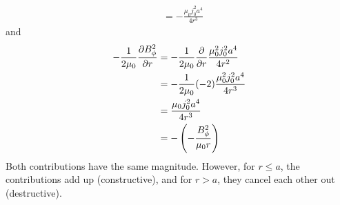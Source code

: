 \documentclass[answers]{exam}
\begin{document}
\begin{questions}
\begin{solution}
\begin{align*}
                                 &= -\frac{\mu_0j_0^2a^4}{4r^3}
    \end{align*}
    and
    \begin{align*}
        -\frac{1}{2\mu_0} \frac{\partial B_\phi^2}{\partial r} &= -\frac{1}{2\mu_0} \frac{\partial }{\partial r} \frac{\mu_0^2j_0^2a^4}{4r^2} \\
                                            &= -\frac{1}{2\mu_0} (-2) \frac{\mu_0^2j_0^2a^4}{4r^3} \\
                                            &= \frac{\mu_0j_0^2a^4}{4r^3} \\
                                            &= -\left(-\frac{B_\phi^2}{\mu_0r}\right)
    \end{align*}
    Both contributions have the same magnitude. However, for $r \leq a$, the contributions add up (constructive), and for $r > a$, they cancel each other out (destructive).
\end{solution}
\end{questions}
\end{document}
